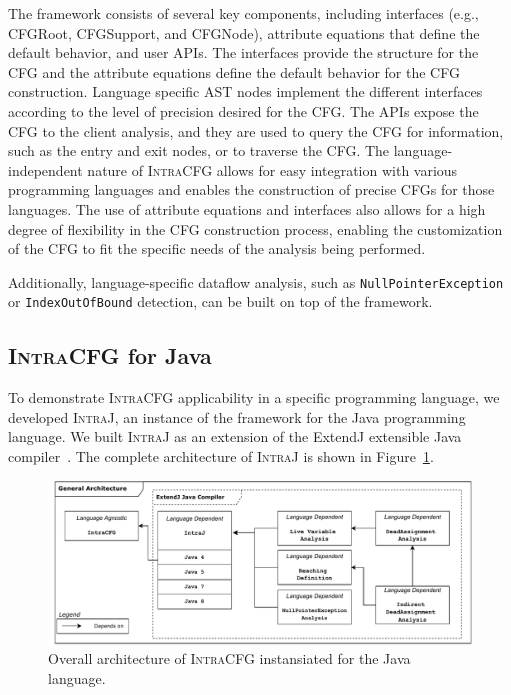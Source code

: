 The framework consists of several key components, including interfaces
(e.g., CFGRoot, CFGSupport, and CFGNode), attribute equations that define the
default behavior, and user APIs. The interfaces provide the structure for the
CFG and the attribute equations define the default behavior for the CFG
construction. Language specific AST nodes implement the different interfaces 
according to the level of precision desired for the CFG.
The APIs expose the CFG to the client analysis, and they are used to query the CFG
for information, such as the entry and exit nodes, or to traverse the CFG.
The language-independent nature of \textsc{IntraCFG} allows for easy integration 
with various programming languages and enables the construction of precise CFGs 
for those languages. The use of attribute equations and interfaces also allows 
for a high degree of flexibility in the CFG construction process, 
enabling the customization of the CFG to fit the specific needs of the 
analysis being performed.

Additionally, language-specific dataflow analysis, such as \texttt{NullPointerException} or
\texttt{IndexOutOfBound} detection, can be built on top of the framework.





\subsection{\textsc{IntraCFG} for Java}
To demonstrate \textsc{IntraCFG} applicability in a specific programming language, we developed
\textsc{IntraJ}, an instance of the framework for the Java programming language.
We built \textsc{IntraJ} as an extension of the ExtendJ extensible Java compiler~\cite{DBLP:conf/oopsla/EkmanH07}.
The complete architecture of \textsc{IntraJ} is shown in Figure~\ref{fig:intraJ}.
\begin{figure}[H]
    \centering
    \includegraphics[scale=0.52]{kappa/img/architecturejava.pdf}
    \caption{\label{fig:intraJ} Overall architecture of \textsc{IntraCFG} instansiated for the Java language.}
\end{figure}

